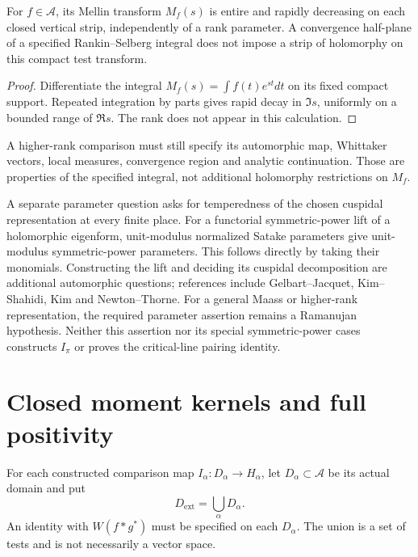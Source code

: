 \begin{proposition}
\label{v4-arith:w6-b:prop:JPSS-strip}
For $f\in\mathscr A$, its Mellin transform $M_f(s)$ is entire and
rapidly decreasing on each closed vertical strip, independently
of a rank parameter. A convergence half-plane of a specified
Rankin--Selberg integral does not impose a strip of holomorphy on
this compact test transform.
\end{proposition}
\begin{proof}
Differentiate the integral $M_f(s)=\int f(t)e^{st}dt$ on its fixed
compact support. Repeated integration by parts gives rapid decay
in $\Im s$, uniformly on a bounded range of $\Re s$.
The rank does not appear in this calculation.
\end{proof}
A higher-rank comparison must still specify its automorphic map,
Whittaker vectors, local measures, convergence region and analytic
continuation. Those are properties of the specified integral, not
additional holomorphy restrictions on $M_f$.
\begin{remark}
\label{v4-arith:w6-b:rem:JPSS-Ramanujan}
A separate parameter question asks for temperedness of the chosen
cuspidal representation at every finite place. For a functorial
symmetric-power lift of a holomorphic eigenform, unit-modulus
normalized Satake parameters give unit-modulus symmetric-power
parameters. This follows directly by taking their monomials.
Constructing the lift and deciding its cuspidal decomposition are
additional automorphic questions; references include
Gelbart--Jacquet, Kim--Shahidi, Kim and Newton--Thorne.
For a general Maass or higher-rank representation, the required
parameter assertion remains a Ramanujan hypothesis.
Neither this assertion nor its special symmetric-power cases
constructs $I_\pi$ or proves the critical-line pairing identity.
\end{remark}

\section{Closed moment kernels and full positivity}
\label{v4-arith:w6-b:union-density}
\label{v4-arith:w6-b:union-density:closure}

\begin{definition}
\label{v4-arith:w6-b:def:extended-class}
For each constructed comparison map $I_\alpha:D_\alpha\to H_\alpha$,
let $D_\alpha\subset\mathscr A$ be its actual domain and put
\begin{equation}
\label{v4-arith:w6-b:eq:extended-class}
 D_{\mathrm{ext}}=\bigcup_\alpha D_\alpha.
\end{equation}
An identity with $W(f*g^*)$ must be specified on each $D_\alpha$.
The union is a set of tests and is not necessarily a vector space.
\end{definition}

